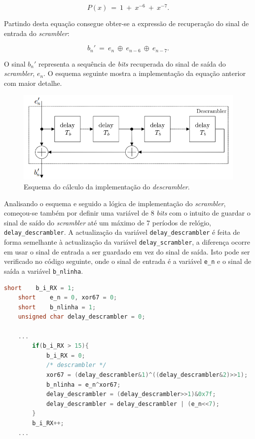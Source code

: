 \documentclass[11pt]{article}
\numberwithin{equation}{section}
\begin{document}
\vspace{-3mm}
\begin{equation}
P(x)~= ~1~+~x^{-6}~+~x^{-7}.
\end{equation}

\vspace{1mm}
Partindo desta equação consegue obter-se a expressão de recuperação do sinal de entrada do \textit{scrambler}:

\vspace{-3mm}
\begin{equation}
b_n'~= ~e_n~\oplus~e_{n-6}~\oplus~e_{n-7}.
\end{equation}  

\vspace{1mm}
O sinal $b_n'$ representa a sequência de \textit{bits} recuperada do sinal de saída do \textit{scrambler}, $e_n$. O esquema seguinte mostra a implementação da equação anterior com maior detalhe.

\begin{figure}[H]
	\centering
	\includegraphics[keepaspectratio=true, scale=0.60]{teoricas/descrambler}
	\caption{Esquema do cálculo da implementação do \textit{descrambler}.}
	\vspace{-0.8em}
\end{figure}

Analisando o esquema e seguido a lógica de implementação do \textit{scrambler}, começou-se também por definir uma variável de 8 \textit{bits} com o intuito de guardar o sinal de saído do \textit{scrambler} até um máximo de 7 períodos de relógio, \texttt{delay\_descrambler}. A actualização da variável \texttt{delay\_descrambler} é feita de forma semelhante à actualização da variável \texttt{delay\_scrambler}, a diferença ocorre em usar o sinal de entrada a ser guardado em vez do sinal de saída. Isto pode ser verificado no código seguinte, onde o sinal de entrada é a variável \texttt{e\_n} e o sinal de saída a variável \texttt{b\_nlinha}.

\begin{lstlisting}[language=C]
	short    b_i_RX = 1;
	short    e_n = 0, xor67 = 0;
	short    b_nlinha = 1;
	unsigned char delay_descrambler = 0;
	
	...
		if(b_i_RX > 15){
			b_i_RX = 0;
			/* descrambler */
			xor67 = (delay_descrambler&1)^((delay_descrambler&2)>>1);
			b_nlinha = e_n^xor67;
			delay_descrambler = (delay_descrambler>>1)&0x7f;
			delay_descrambler = delay_descrambler | (e_n<<7);
		}
		b_i_RX++;
	...
\end{lstlisting}
\end{document}
